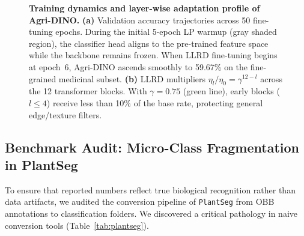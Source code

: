 \documentclass[10pt,twocolumn,letterpaper]{article}
\begin{document}
\begin{figure}[t]
\begin{minipage}{0.48\textwidth}
\end{minipage}
\caption{
  \textbf{Training dynamics and layer-wise adaptation profile of Agri-DINO.}
  \textbf{(a)} Validation accuracy trajectories across 50 fine-tuning epochs. During the initial 5-epoch LP warmup (gray shaded region), the classifier head aligns to the pre-trained feature space while the backbone remains frozen. When LLRD fine-tuning begins at epoch~6, Agri-DINO ascends smoothly to 59.67\% on the fine-grained medicinal subset.
  \textbf{(b)} LLRD multipliers $\eta_l/\eta_0 = \gamma^{12-l}$ across the 12 transformer blocks. With $\gamma{=}0.75$ (green line), early blocks ($l\le 4$) receive less than 10\% of the base rate, protecting general edge/texture filters.
}
\label{fig:dynamics}
\vspace{-6pt}
\end{figure}

\subsection{Benchmark Audit: Micro-Class Fragmentation in PlantSeg}
\label{sec:plantseg}

To ensure that reported numbers reflect true biological recognition rather than data artifacts, we audited the conversion pipeline of \texttt{PlantSeg} from OBB annotations to classification folders. We discovered a critical pathology in naive conversion tools (Table~\ref{tab:plantseg}).
\end{document}
